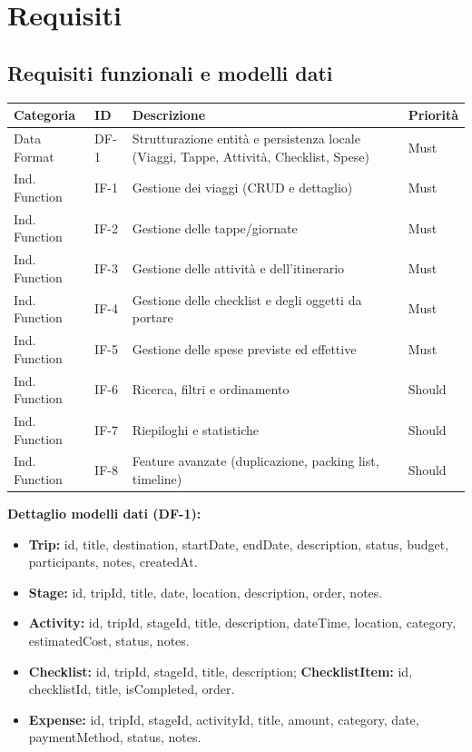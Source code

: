 \documentclass[11pt, a4paper]{article}
\begin{document}
\section{Requisiti}

\subsection{Requisiti funzionali e modelli dati}

\begin{table}[h!]
    \centering
    \renewcommand{\arraystretch}{1.3}
    \begin{tabularx}{\textwidth}{>{\raggedright\arraybackslash}p{2.6cm} l X l}
        \toprule
        \textbf{Categoria} & \textbf{ID} & \textbf{Descrizione} & \textbf{Priorità} \\
        \midrule
        Data Format & DF-1 & Strutturazione entità e persistenza locale (Viaggi, Tappe, Attività, Checklist, Spese) & Must \\
        Ind. Function & IF-1 & Gestione dei viaggi (CRUD e dettaglio) & Must \\
        Ind. Function & IF-2 & Gestione delle tappe/giornate & Must \\
        Ind. Function & IF-3 & Gestione delle attività e dell'itinerario & Must \\
        Ind. Function & IF-4 & Gestione delle checklist e degli oggetti da portare & Must \\
        Ind. Function & IF-5 & Gestione delle spese previste ed effettive & Must \\
        Ind. Function & IF-6 & Ricerca, filtri e ordinamento & Should \\
        Ind. Function & IF-7 & Riepiloghi e statistiche & Should \\
        Ind. Function & IF-8 & Feature avanzate (duplicazione, packing list, timeline) & Should \\
        \bottomrule
    \end{tabularx}
\end{table}

\noindent \textbf{Dettaglio modelli dati (DF-1):}
\begin{itemize}[nosep]
    \item \textbf{Trip:} id, title, destination, startDate, endDate, description, status,
    budget, participants, notes, createdAt.
    \item \textbf{Stage:} id, tripId, title, date, location, description, order, notes.
    \item \textbf{Activity:} id, tripId, stageId, title, description, dateTime, location,
    category, estimatedCost, status, notes.
    \item \textbf{Checklist:} id, tripId, stageId, title, description; \textbf{ChecklistItem:}
    id, checklistId, title, isCompleted, order.
    \item \textbf{Expense:} id, tripId, stageId, activityId, title, amount, category, date,
    paymentMethod, status, notes.
\end{itemize}
\end{document}
